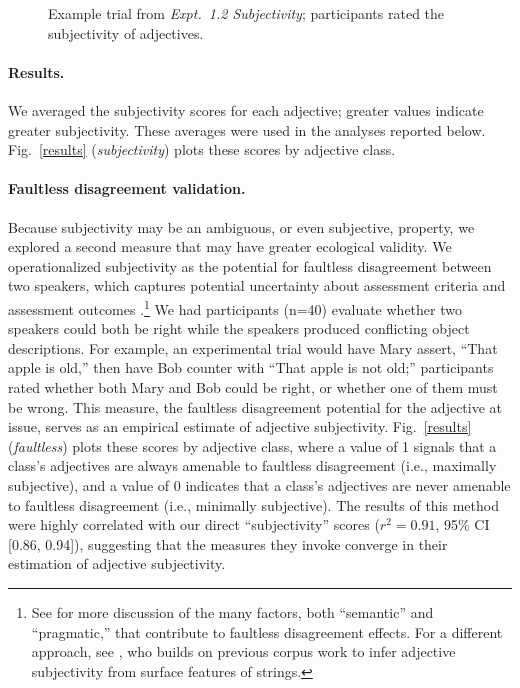 \documentclass[12pt]{article}
\begin{document}
\begin{figure}[h]
	\centering
	\caption{Example trial from \emph{Expt.\ 1.2 Subjectivity}; participants rated the subjectivity of adjectives.}\label{subjectivity-trial}
\end{figure}

\paragraph{Results.} We averaged the subjectivity scores for each adjective; greater values indicate greater subjectivity. These averages were used in the analyses reported below. Fig.\ \ref{results} (\emph{subjectivity}) plots these scores by adjective class.

\paragraph{Faultless disagreement validation.} Because subjectivity may be an ambiguous, or even subjective, property, we explored a second measure that may have greater ecological validity. 
We operationalized subjectivity as the potential for faultless disagreement between two speakers, which captures potential uncertainty about assessment criteria and assessment outcomes \citep{Kolbel2004,kennedy2013,barker2013}.\footnote{See \cite{MacFarlane2014} for more discussion of the many factors, both ``semantic'' and ``pragmatic,'' that contribute to faultless disagreement effects. For a different approach, see \cite{hill2012}, who builds on previous corpus work \citep{wulff2003} to infer adjective subjectivity from surface features of strings.}
We had participants (n=40) evaluate whether two speakers could both be right while the speakers produced conflicting object descriptions. For example, an experimental trial would have Mary assert, ``That apple is old,'' then have Bob counter with ``That apple is not old;'' 
participants rated whether both Mary and Bob could be right, or whether one of them must be wrong. This measure, the faultless disagreement potential for the adjective at issue, serves as an empirical estimate of adjective subjectivity. 
Fig.\ \ref{results} (\emph{faultless}) plots these scores by adjective class, where a value of 1 signals that a class's adjectives are always amenable to faultless disagreement (i.e., maximally subjective), and a value of 0 indicates that a class's adjectives are never amenable to faultless disagreement (i.e., minimally subjective).
The results of this method were highly correlated with our direct ``subjectivity'' scores ($r^{2} = 0.91$, 95\% CI [0.86, 0.94]), suggesting that the measures they invoke converge in their estimation of adjective subjectivity. 
\end{document}
